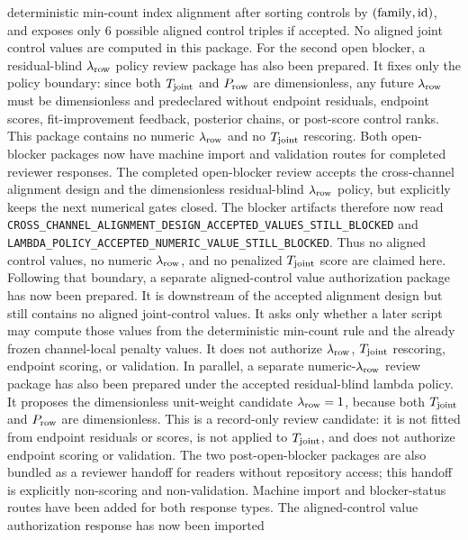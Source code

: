 deterministic min-count index alignment after sorting controls by
\(({\rm family},{\rm id})\), and exposes only \(6\) possible aligned control
triples if accepted.  No aligned joint control values are computed in this
package.
For the second open blocker, a residual-blind \(\lambda_{\rm row}\) policy
review package has also been prepared.  It fixes only the policy boundary:
since both \(T_{\rm joint}\) and \(P_{\rm row}\) are dimensionless, any future
\(\lambda_{\rm row}\) must be dimensionless and predeclared without endpoint
residuals, endpoint scores, fit-improvement feedback, posterior chains, or
post-score control ranks.  This package contains no numeric
\(\lambda_{\rm row}\) and no \(T_{\rm joint}\) rescoring.
Both open-blocker packages now have machine import and validation routes for
completed reviewer responses.  The completed open-blocker review accepts the
cross-channel alignment design and the dimensionless residual-blind
\(\lambda_{\rm row}\) policy, but explicitly keeps the next numerical gates
closed.  The blocker artifacts therefore now read
\texttt{CROSS\_CHANNEL\_ALIGNMENT\_DESIGN\_ACCEPTED\_VALUES\_STILL\_BLOCKED}
and
\texttt{LAMBDA\_POLICY\_ACCEPTED\_NUMERIC\_VALUE\_STILL\_BLOCKED}.  Thus no
aligned control values, no numeric \(\lambda_{\rm row}\), and no penalized
\(T_{\rm joint}\) score are claimed here.
Following that boundary, a separate aligned-control value authorization package
has now been prepared.  It is downstream of the accepted alignment design but
still contains no aligned joint-control values.  It asks only whether a later
script may compute those values from the deterministic min-count rule and the
already frozen channel-local penalty values.  It does not authorize
\(\lambda_{\rm row}\), \(T_{\rm joint}\) rescoring, endpoint scoring, or
validation.
In parallel, a separate numeric-\(\lambda_{\rm row}\) review package has also
been prepared under the accepted residual-blind lambda policy.  It proposes the
dimensionless unit-weight candidate \(\lambda_{\rm row}=1\), because both
\(T_{\rm joint}\) and \(P_{\rm row}\) are dimensionless.  This is a record-only
review candidate: it is not fitted from endpoint residuals or scores, is not
applied to \(T_{\rm joint}\), and does not authorize endpoint scoring or
validation.
The two post-open-blocker packages are also bundled as a reviewer handoff for
readers without repository access; this handoff is explicitly non-scoring and
non-validation.
Machine import and blocker-status routes have been added for both response
types.  The aligned-control value authorization response has now been imported
